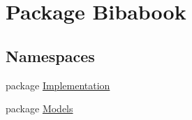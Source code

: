 \hypertarget{namespace_bibabook}{}\section{Package Bibabook}
\label{namespace_bibabook}
\subsection*{Namespaces}
\begin{DoxyCompactItemize}
\item 
package \hyperlink{namespace_bibabook_1_1_implementation}{Implementation}
\item 
package \hyperlink{namespace_bibabook_1_1_models}{Models}
\end{DoxyCompactItemize}
